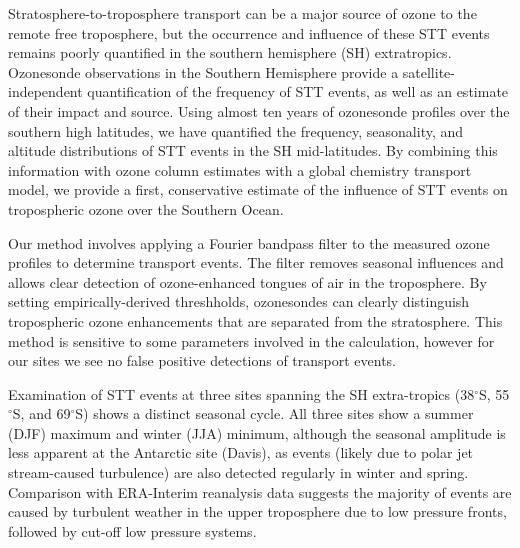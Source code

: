   
  
Stratosphere-to-troposphere transport can be a major source of ozone to the remote free troposphere, but the occurrence and influence of these STT events remains poorly quantified in the southern hemisphere (SH) extratropics.
Ozonesonde observations in the Southern Hemisphere provide a satellite-independent quantification of the frequency of STT events, as well as an estimate of their impact and source.
Using almost ten years of ozonesonde profiles over the southern high latitudes, we have quantified the frequency, seasonality, and altitude distributions of STT events in the SH mid-latitudes. 
By combining this information with ozone column estimates with a global chemistry transport model, we provide a first, conservative estimate of the influence of STT events on tropospheric ozone over the Southern Ocean.

Our method involves applying a Fourier bandpass filter to the measured ozone profiles to determine transport events.
The filter removes seasonal influences and allows clear detection of ozone-enhanced tongues of air in the troposphere.
By setting empirically-derived threshholds, ozonesondes can clearly distinguish tropospheric ozone enhancements that are separated from the stratosphere.
This method is sensitive to some parameters involved in the calculation, however for our sites we see no false positive detections of transport events.

Examination of STT events at three sites spanning the SH extra-tropics (38$^{\circ}$S, 55$^{\circ}$S, and 69$^{\circ}$S) shows a distinct seasonal cycle.
All three sites show a summer (DJF) maximum and winter (JJA) minimum, although the seasonal amplitude is less apparent at the Antarctic site (Davis), as events (likely due to polar jet stream-caused turbulence) are also detected regularly in winter and spring.  %
Comparison with ERA-Interim reanalysis data suggests the majority of events are caused by turbulent weather in the upper troposphere due to low pressure fronts, followed by cut-off low pressure systems.


